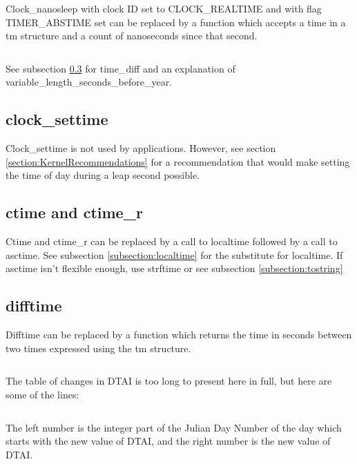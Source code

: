 \documentclass[letterpaper,twoside]{article}
\begin{document}
Clock\_nanosleep with clock ID set to CLOCK\_REAL\-TIME and with flag
TIMER\_ABS\-TIME set can be replaced by a function which accepts
a time in a {\ttfamily tm} structure and a count of nanoseconds
since that second.
\inputminted[firstline=32]{c}{src/time_sleep_until.c}
See subsection \ref{subsection:difftime} for time\_diff
and an explanation of variable\_length\_sec\-onds\_before\_year.

\subsection{clock\_settime}
Clock\_settime is not used by applications.
However, see section \ref{section:KernelRecommendations} for a
recommendation that would make setting the time of day during a
leap second possible.

\subsection{ctime and ctime\_r}
Ctime and ctime\_r can be replaced by a call to localtime followed by
a call to asctime.  See subsection \ref{subsection:localtime}
for the substitute for localtime.
If asctime isn't flexible enough, use strftime or see subsection
\ref{subsection:tostring}

\subsection{difftime}
\label{subsection:difftime}
Difftime can be replaced by a function which returns the time in seconds
between two times expressed using the {\ttfamily tm} structure.
\inputminted[firstline=37]{c}{src/time_diff.c}
The table of changes in DTAI is too long to present here in full,
but here are some of the lines:
\inputminted[firstline=46156,lastline=46184]{c}{dtai_table.tab}
The left number is the integer part of the Julian Day Number of the day
which starts with the new value of DTAI, and the right number is the new
value of DTAI.
\end{document}
